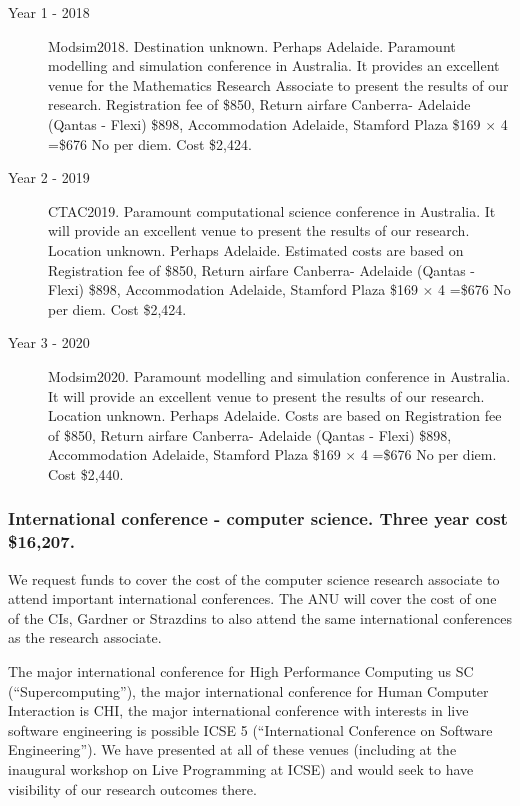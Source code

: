 \documentclass[a4paper,fontsize=12pt]{scrartcl}
\begin{document}
\begin{description}
\item[Year 1 - 2018] Modsim2018. Destination unknown. Perhaps Adelaide.
Paramount modelling and simulation conference in Australia. It provides an excellent venue for the Mathematics Research Associate to present the results of our research. 
Registration fee of \$850, 
Return airfare Canberra- Adelaide (Qantas - Flexi) \$898,
Accommodation Adelaide, Stamford Plaza \$169 $\times$ 4 =\$676
No per diem. Cost \$2,424.



\item[Year 2 - 2019] CTAC2019.
Paramount computational science conference in Australia. It will provide an excellent venue to present the results of our research. Location unknown. Perhaps Adelaide.
Estimated costs are based on 
Registration fee of \$850, 
Return airfare Canberra- Adelaide (Qantas - Flexi) \$898,
Accommodation Adelaide, Stamford Plaza \$169 $\times$ 4 =\$676
No per diem. Cost \$2,424.

\item[Year 3 - 2020] Modsim2020.
Paramount modelling and simulation conference in Australia. It will provide an excellent venue to present the results of our research. Location unknown. Perhaps Adelaide.
Costs are based on 
Registration fee of \$850, 
Return airfare Canberra- Adelaide (Qantas - Flexi) \$898,
Accommodation Adelaide, Stamford Plaza \$169 $\times$ 4 =\$676
No per diem. Cost \$2,440.




\end{description}

\subsubsection*{International conference - computer science. Three year cost \$16,207.}


We request funds to cover the cost of the computer science research associate to attend important international conferences.    
The ANU will cover the cost of one of the CIs, Gardner or Strazdins to also attend the same international conferences as the research associate. 

The major international conference for High Performance Computing us SC (``Supercomputing''), the major international conference for Human Computer Interaction is CHI, the major international conference with interests in live software engineering is possible ICSE 5 (``International Conference on Software Engineering''). We have presented at all of these venues (including at the inaugural workshop on Live Programming at ICSE) and would seek to have visibility of our research outcomes there. 
\end{document}
